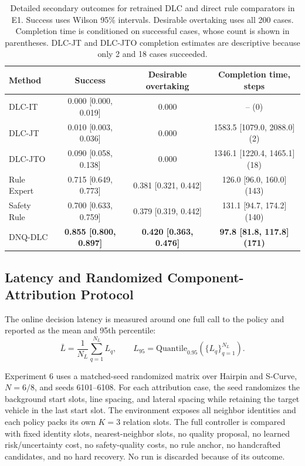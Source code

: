 \documentclass[journal]{IEEEtran}
\begin{document}
\begin{table}[t]
\centering
\caption{Detailed secondary outcomes for retrained DLC and direct rule comparators in E1. Success uses Wilson 95\% intervals. Desirable overtaking uses all 200 cases. Completion time is conditioned on successful cases, whose count is shown in parentheses. DLC-JT and DLC-JTO completion estimates are descriptive because only 2 and 18 cases succeeded.}
\label{tab:supp_dlc_secondary}
\begin{tabular}{lccc}
\toprule
Method & Success & Desirable overtaking & Completion time, steps \\
\midrule
DLC-IT & 0.000 [0.000, 0.019] & 0.000 & -- (0) \\
DLC-JT & 0.010 [0.003, 0.036] & 0.000 & 1583.5 [1079.0, 2088.0] (2) \\
DLC-JTO & 0.090 [0.058, 0.138] & 0.000 & 1346.1 [1220.4, 1465.1] (18) \\
Rule Expert & 0.715 [0.649, 0.773] & 0.381 [0.321, 0.442] & 126.0 [96.0, 160.0] (143) \\
Safety Rule & 0.700 [0.633, 0.759] & 0.379 [0.319, 0.442] & 131.1 [94.7, 174.2] (140) \\
DNQ-DLC & \textbf{0.855 [0.800, 0.897]} & \textbf{0.420 [0.363, 0.476]} & \textbf{97.8 [81.8, 117.8] (171)} \\
\bottomrule
\end{tabular}
\end{table}

\subsection{Latency and Randomized Component-Attribution Protocol}
\label{supp:attribution_protocol}

The online decision latency is measured around one full call to the
policy and reported as the mean and 95th percentile:
\begin{equation}
\bar{L}
=
\frac{1}{N_L}
\sum_{q=1}^{N_L} L_q,
\qquad
L_{95}
=
\mathrm{Quantile}_{0.95}(\{L_q\}_{q=1}^{N_L}).
\end{equation}

Experiment 6 uses a matched-seed randomized matrix over Hairpin and
S-Curve, $N=6/8$, and seeds 6101--6108. For each attribution case, the seed
randomizes the background start slots, line spacing, and lateral
spacing while retaining the target vehicle in the last start slot. The
environment exposes all neighbor identities and each policy packs its
own $K=3$ relation slots. The full controller is compared with fixed
identity slots, nearest-neighbor slots, no quality proposal, no learned
risk/uncertainty cost, no safety-quality costs, no rule anchor, no
handcrafted candidates, and no hard recovery. No run is discarded because of its outcome.
\end{document}
